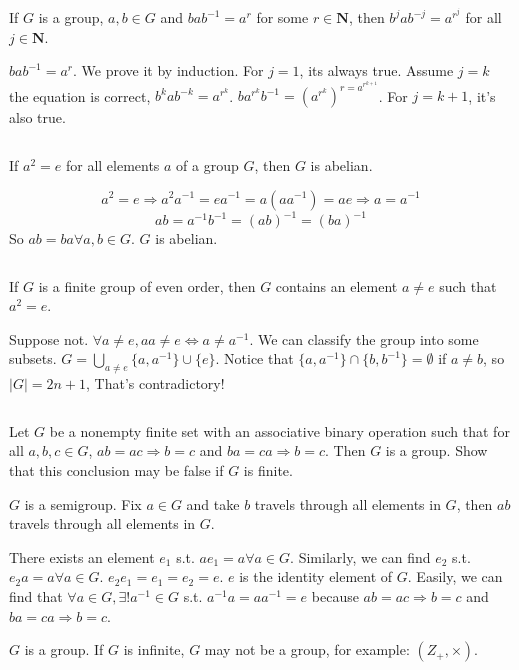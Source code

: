 $$ $$

\begin{ex}
    If $G$ is a group, $a,b\in G$ and $bab^{-1}=a^{r}$ for some $r\in \mathbf{N}$, then $b^{j}ab^{-j}=a^{r^{j}}$ for all $j\in \mathbf{N}$. 
\end{ex}

\begin{answer}
    $bab^{-1}= a^{r}$. We prove it by induction. For $j=1$, its always true. Assume $j=k$ the equation is correct, $b^{k}ab^{-k}=a^{r^{k}}$. $ba^{r^{k}}b^{-1}=(a^{r^{k}})^{r=a^{r^{k+1}}}$. For $j=k+1$, it's also true.
\end{answer}

$$ $$

\begin{ex}
    If $a^{2}=e$ for all elements $a$ of a group $G$, then $G$ is abelian.
\end{ex}

\begin{answer}
    \[a^{2}=e\Rightarrow a^{2}a^{-1}=ea^{-1}=a(aa^{-1})=ae\Rightarrow a=a^{-1}\]\[ab=a^{-1}b^{-1}=(ab)^{-1}=(ba)^{-1}\]So  $ab=ba \forall a,b \in G$. $G$ is abelian.
\end{answer}

$$ $$

\begin{ex}
    If $G$ is a finite group of even order, then $G$ contains an element $a\neq e$ such that $a^{2}=e$.
\end{ex}

\begin{answer}
    Suppose not. $\forall a\neq e, aa\neq e \Leftrightarrow a\neq a^{-1}$. We can classify the group into some subsets. $G=\bigcup\limits_{a\neq e}\{a,a^{-1}\}\cup\{e\}$. Notice that $\{a,a^{-1}\}\cap\{b,b^{-1}\}=\emptyset$ if $a\neq b$, so $\left| G \right| =2n+1$, That's contradictory!
\end{answer}

$$ $$

\begin{ex}
    Let $G$ be a nonempty finite set with an associative binary operation such that for all $a, b, c\in G$, $ab = ac\Rightarrow b = c$ and $ba  =ca \Rightarrow b = c$. Then $G$ is a group. Show that this conclusion may be false if $G$ is finite.
\end{ex}

\begin{answer}
    $G$ is a semigroup. Fix $a\in G$ and take $b$ travels through all elements in $G$, then $ab$ travels through all elements in $G$.

    There exists an element $e_1$ s.t. $ae_1=a\forall a\in G$. Similarly, we can find $e_2$ s.t. $e_2a=a\forall a\in G$. $e_2e_1=e_1=e_2=e$. $e$ is the identity element of $G$. Easily, we can find that $\forall a\in G, \exists ! a^{-1}\in G$ s.t. $a^{-1}a=aa^{-1}=e$ because $ab = ac\Rightarrow b = c$ and $ba  =ca \Rightarrow b = c$.

    $G$ is a group. If $G$ is infinite, $G$ may not be a group, for example: $(Z_+,\times)$.
\end{answer}

